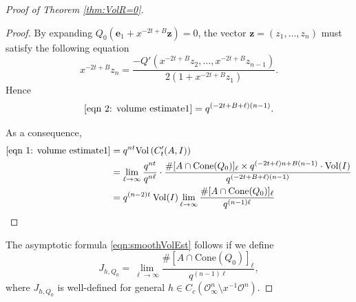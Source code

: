 \documentclass[10pt,a4paper]{amsart}
\def\vol{\mathrm{Vol}}
\newcommand{\Cone}{\mathrm{Cone}}
\begin{document}
\begin{proof}[Proof of Theorem \ref{thm:VolR=0}]
\begin{proof}
By expanding $Q_0( \mathbf e_1+x^{-2t+B}\mathbf z)=0$, the vector $\mathbf z=(z_1, \ldots, z_n)$ must satisfy the following equation 
\[
x^{-2t+B}z_n=\frac {-Q'(x^{-2t+B}z_2, \ldots,x^{-2t+B}z_{n-1})}{2(1+x^{-2t+B}z_1)}.
\]
Hence 
\[
\eqref{eqn 2: volume estimate1}=q^{(-2t+B+\ell)(n-1)}.
\]

As a consequence, 
\[\begin{split}
\eqref{eqn 1: volume estimate1}
&=q^{nt}\vol\left(C'_t(A,I)\right)\\
&=\lim_{\ell\rightarrow \infty}\frac {q^{nt}}{q^{n\ell}}\cdot \frac{\#[A\cap \Cone(Q_0)]_\ell\times q^{(-2t+\ell)n+B(n-1)}\cdot \vol(I)}{q^{(-2t+B+\ell)(n-1)}}\\
&=q^{(n-2)t}\: \vol(I)\lim_{\ell\rightarrow \infty} \frac {\#[A\cap \Cone(Q_0)]_\ell}{q^{(n-1)\ell}}
\end{split}\]
\end{proof}
The asymptotic formula \eqref{eqn:smoothVolEst} follows if we define
\[
J_{h,Q_0}=\lim_{\ell\rightarrow \infty} \frac {\#[A\cap \Cone(Q_0)]_\ell}{q^{(n-1)\ell}},
\]
where $J_{h,Q_0}$ is well-defined for general $h\in C_c(\mathcal O^n_\infty\setminus x^{-1}\mathcal O^n)$.
\end{proof}
\end{document}
